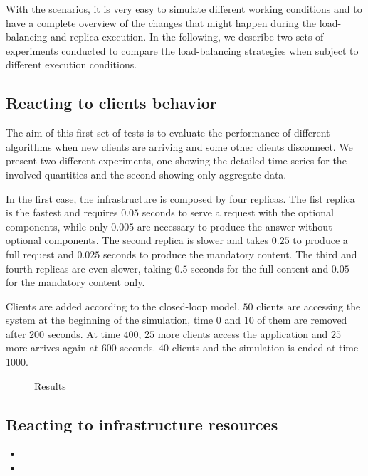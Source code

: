 With the scenarios, it is very easy to simulate different working
conditions and to have a complete overview of the changes that might
happen during the load-balancing and replica execution. In the following,
we describe two sets of experiments conducted to compare the load-balancing
strategies when subject to different execution conditions.

\subsection{Reacting to clients behavior}

The aim of this first set of tests is to evaluate the performance of
different algorithms when new clients are arriving and some other clients
disconnect. We present two different experiments, one showing the detailed
time series for the involved quantities and the second showing only
aggregate data.

In the first case, the infrastructure is composed by four replicas. The
fist replica is the fastest and requires $0.05$ seconds to serve a
request with the optional components, while only $0.005$ are necessary to
produce the answer without optional components. The second replica is slower
and takes $0.25$ to produce a full request and $0.025$ seconds to produce
the mandatory content. The third and fourth replicas are even slower, 
taking $0.5$ seconds for the full content and $0.05$ for the mandatory 
content only.

Clients are added according to the closed-loop model. $50$ clients are
accessing the system at the beginning of the simulation, time $0$ and $10$ of 
them are removed after $200$ seconds. At time $400$, $25$ more clients
access the application and $25$ more arrives again at $600$ seconds. 
$40$ clients and the simulation is ended at time $1000$.

\begin{figure}
\centering

\caption{Results}
\label{fig:clientchanges-full}
\end{figure}

\subsection{Reacting to infrastructure resources}

\begin{itemize}
\item {}
\item {}
\end{itemize}

